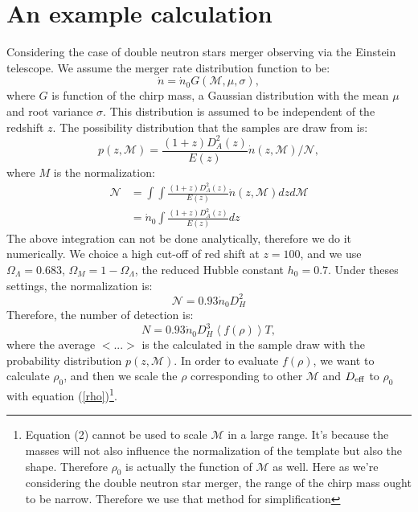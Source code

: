 \documentclass[fleqn,usenatbib]{mnras}
\begin{document}
\section{An example calculation}
Considering the case of double neutron stars merger observing via the Einstein telescope. We assume the merger rate distribution function to be:
\begin{equation}
    \dot{n}=\dot{n}_0G(\mathcal{M},\mu,\sigma),
\end{equation}
where $G$ is function of the chirp mass, a Gaussian distribution with the mean $\mu$ and root variance $\sigma$. This distribution is assumed to be independent of the redshift $z$. The possibility distribution that the samples are draw from is:
\begin{equation}
    p(z,\mathcal{M})=\frac{(1+z)D^2_A(z)}{E(z)}\dot{n}(z,\mathcal{M})/\mathcal{N}, 
\end{equation}
where $M$ is the normalization: 
\begin{align}
    \mathcal{N}&=\int\int\frac{(1+z)D^2_A(z)}{E(z)}\dot{n}(z,\mathcal{M})dzd\mathcal{M}\\\nonumber
               &=\dot{n}_0\int\frac{(1+z)D^2_A(z)}{E(z)}dz
\end{align}
The above integration can not be done analytically, therefore we do it numerically.  We choice a high cut-off of red shift at $z=100$, and we use $\Omega_\Lambda=0.683$, $\Omega_M=1-\Omega_\Lambda$, the reduced Hubble constant $h_0=0.7$. Under theses settings, the normalization is:
\begin{equation}
    \mathcal{N}=0.93\dot{n}_0D^2_H
\end{equation}
Therefore, the number of detection is:
\begin{equation}
    N=0.93\dot{n}_0D_H^3\left<f(\rho)\right>T,
    \label{eqn:number}
\end{equation}
where the average $<...>$ is the calculated in the sample draw with the probability distribution $p(z,\mathcal{M})$. 
In order to evaluate $f(\rho)$, we want to calculate $\rho_0$, and then we scale the $\rho$ corresponding to other $\mathcal{M}$ and $D_{\rm{eff}}$ to $\rho_0$ with equation (\ref{rho})\footnote{Equation (2) cannot be used to scale $\mathcal{M}$ in a large range. It's because the masses will not also influence the normalization of the template but also the shape. Therefore $\rho_0$ is actually the function of $\mathcal{M}$ as well. Here as we're considering the double neutron star merger, the range of the chirp mass ought to be narrow. Therefore we use that method for simplification}. 
\end{document}
